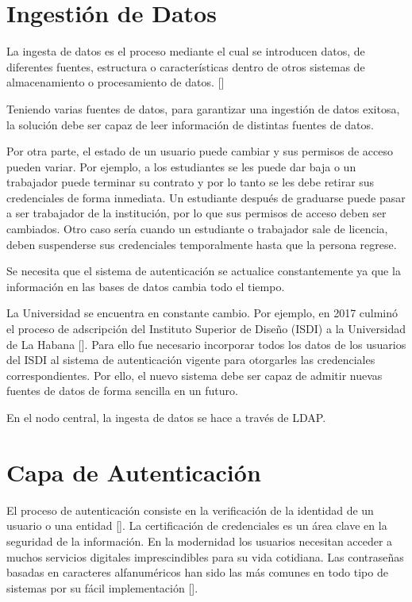 \section{Ingestión de Datos} \label{data-layer}
La ingesta de datos es el proceso mediante el cual se introducen datos, de diferentes fuentes,
estructura o características dentro de otros sistemas de almacenamiento o procesamiento de
datos.  [\cite{fernandez2020aplicacion}]

Teniendo varias fuentes de datos, para garantizar una ingestión de datos exitosa, la solución debe ser capaz de leer información de distintas fuentes de datos. 

Por otra parte, el estado de un usuario puede cambiar y sus permisos de acceso pueden variar. Por ejemplo, a los estudiantes se les puede dar baja o un trabajador puede terminar su contrato y por lo tanto se les debe retirar sus credenciales de forma inmediata. Un estudiante después de graduarse puede pasar a ser trabajador de la institución, por lo que sus permisos de acceso deben ser cambiados. Otro caso sería cuando un estudiante o trabajador sale de licencia, deben suspenderse sus credenciales temporalmente hasta que la persona regrese. 

Se necesita que el sistema de autenticación se actualice constantemente ya que la información en las bases de datos cambia todo el tiempo.

La Universidad  se encuentra en constante cambio. Por ejemplo, en 2017 culminó el proceso de adscripción del Instituto Superior de Diseño (ISDI) a la Universidad de La Habana [\cite{isdi-historia}]. Para ello fue necesario incorporar todos los datos de los usuarios del ISDI al sistema de autenticación vigente para otorgarles las credenciales correspondientes. Por ello, el nuevo sistema debe ser capaz de admitir nuevas fuentes de datos de forma sencilla en un futuro. 

En el nodo central, la ingesta de datos se hace a través de LDAP.


\section{Capa de Autenticación} \label{auth-layer}
El proceso de autenticación consiste en la verificación de la identidad de un usuario o una entidad  [\cite{teheran2014mecanismo}]. La certificación de credenciales es un área clave en la seguridad de la información. En la modernidad los usuarios necesitan acceder a muchos servicios digitales imprescindibles para su vida cotidiana. Las contraseñas basadas en caracteres alfanuméricos han sido las más comunes en todo tipo de sistemas por su fácil implementación [\cite{rodriguez2018seguridad}].

